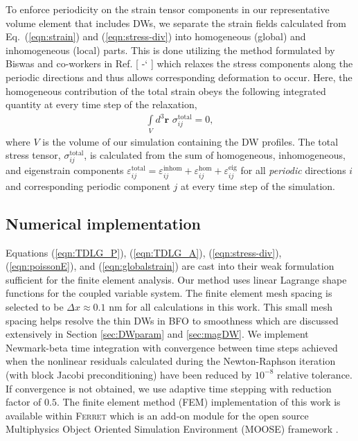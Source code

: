 \documentclass[%
 reprint,
superscriptaddress,
 amsmath,amssymb,
prb,
]{revtex4-1}
\newcommand*{\citen}[1]{%
  \begingroup
    \romannumeral-`\x %
    \setcitestyle{numbers}%
    \cite{#1}%
  \endgroup   
}
\begin{document}
To enforce periodicity on the strain tensor components in our representative volume element that includes DWs, we separate the strain fields calculated from Eq.~(\ref{eqn:strain}) and (\ref{eqn:stress-div}) into homogeneous (global) and inhomogeneous (local) parts.
%
This is done utilizing the method formulated by Biswas and co-workers in Ref. [\citen{Biswas2020}] which relaxes the stress components along the periodic directions and thus allows corresponding deformation to occur.
%
Here, the homogeneous contribution of the total strain obeys the following integrated quantity at every time step of the relaxation,
%
\begin{equation}
\begin{aligned}\label{eqn:globalstrain}
\int\limits_V d^3\mathbf{r} \,\, \sigma_{ij}^\mathrm{total}  = 0,
\end{aligned}
\end{equation}
%
where $V$ is the volume of our simulation containing the DW profiles.
%
The total stress tensor, $\sigma_{ij}^\mathrm{total}$, is calculated from the sum of homogeneous, inhomogeneous, and eigenstrain components $\varepsilon_{ij}^\mathrm{total} = \varepsilon_{ij}^\mathrm{inhom} + \varepsilon_{ij}^\mathrm{hom} + \varepsilon_{ij}^\mathrm{eig}$ for all \emph{periodic} directions $i$ and corresponding periodic component $j$ at every time step of 
the simulation.
%


\subsection{Numerical implementation}\label{sec:num}

Equations (\ref{eqn:TDLG_P}), (\ref{eqn:TDLG_A}), (\ref{eqn:stress-div}), (\ref{eqn:poissonE}), and (\ref{eqn:globalstrain}) are cast into their weak formulation sufficient for the finite element analysis.
%
Our method uses linear Lagrange shape functions for the coupled variable system.
%
The finite element mesh spacing is selected to be $\Delta x \approx 0.1$ nm for all calculations in this work.
%
This small mesh spacing helps resolve the thin DWs in BFO to smoothness which are discussed extensively in Section \ref{sec:DWparam} and \ref{sec:magDW}.
%
We implement Newmark-beta time integration \cite{Newmark1959} with convergence between time steps achieved when the nonlinear residuals calculated during the Newton-Raphson iteration (with block Jacobi preconditioning) have been reduced by $10^{-8}$ relative tolerance.
%
%
%
If convergence is not obtained, we use adaptive time stepping with reduction factor of $0.5$.
%
The finite element method (FEM) implementation of this work is available within \textsc{Ferret} \cite{Mangeri2017} which is an add-on module for the open source Multiphysics Object Oriented Simulation Environment (MOOSE) framework \cite{permann2020moose}.
%
\end{document}
